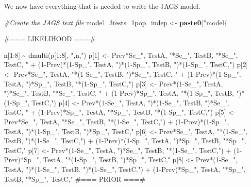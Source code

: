 \documentclass[
]{book}
\newenvironment{Shaded}{\begin{snugshade}}{\end{snugshade}}
\newcommand{\CommentTok}[1]{\textcolor[rgb]{0.56,0.35,0.01}{\textit{#1}}}
\newcommand{\FunctionTok}[1]{\textcolor[rgb]{0.13,0.29,0.53}{\textbf{#1}}}
\newcommand{\NormalTok}[1]{#1}
\newcommand{\OtherTok}[1]{\textcolor[rgb]{0.56,0.35,0.01}{#1}}
\newcommand{\StringTok}[1]{\textcolor[rgb]{0.31,0.60,0.02}{#1}}
\begin{document}
We now have everything that is needed to write the JAGS model.

\begin{Shaded}
\begin{Highlighting}[]
\CommentTok{\#Create the JAGS text file}
\NormalTok{model\_3tests\_1pop\_indep }\OtherTok{\textless{}{-}} \FunctionTok{paste0}\NormalTok{(}\StringTok{"model\{}

\StringTok{\#=== LIKELIHOOD ===\#}

\StringTok{  n[1:8] \textasciitilde{} dmulti(p[1:8], "}\NormalTok{,n,}\StringTok{")}
\StringTok{  p[1] \textless{}{-} Prev*Se\_"}\NormalTok{, TestA, }\StringTok{"*Se\_"}\NormalTok{, TestB, }\StringTok{"*Se\_"}\NormalTok{, TestC, }\StringTok{" + (1{-}Prev)*(1{-}Sp\_"}\NormalTok{, TestA, }\StringTok{")*(1{-}Sp\_"}\NormalTok{, TestB, }\StringTok{")*(1{-}Sp\_"}\NormalTok{, TestC,}\StringTok{")}
\StringTok{  p[2] \textless{}{-} Prev*Se\_"}\NormalTok{, TestA, }\StringTok{"*(1{-}Se\_"}\NormalTok{, TestB, }\StringTok{")*Se\_"}\NormalTok{, TestC, }\StringTok{" + (1{-}Prev)*(1{-}Sp\_"}\NormalTok{, TestA, }\StringTok{")*Sp\_"}\NormalTok{, TestB, }\StringTok{"*(1{-}Sp\_"}\NormalTok{, TestC,}\StringTok{")}
\StringTok{  p[3] \textless{}{-} Prev*(1{-}Se\_"}\NormalTok{, TestA, }\StringTok{")*Se\_"}\NormalTok{, TestB, }\StringTok{"*Se\_"}\NormalTok{, TestC, }\StringTok{" + (1{-}Prev)*Sp\_"}\NormalTok{, TestA, }\StringTok{"*(1{-}Sp\_"}\NormalTok{, TestB, }\StringTok{")*(1{-}Sp\_"}\NormalTok{, TestC,}\StringTok{")}
\StringTok{  p[4] \textless{}{-} Prev*(1{-}Se\_"}\NormalTok{, TestA, }\StringTok{")*(1{-}Se\_"}\NormalTok{, TestB, }\StringTok{")*Se\_"}\NormalTok{, TestC, }\StringTok{" + (1{-}Prev)*Sp\_"}\NormalTok{, TestA, }\StringTok{"*Sp\_"}\NormalTok{, TestB, }\StringTok{"*(1{-}Sp\_"}\NormalTok{, TestC,}\StringTok{")}
\StringTok{  }
\StringTok{  p[5] \textless{}{-} Prev*Se\_"}\NormalTok{, TestA, }\StringTok{"*Se\_"}\NormalTok{, TestB, }\StringTok{"*(1{-}Se\_"}\NormalTok{, TestC,}\StringTok{") + (1{-}Prev)*(1{-}Sp\_"}\NormalTok{, TestA, }\StringTok{")*(1{-}Sp\_"}\NormalTok{, TestB, }\StringTok{")*Sp\_"}\NormalTok{, TestC,}\StringTok{"}
\StringTok{  p[6] \textless{}{-} Prev*Se\_"}\NormalTok{, TestA, }\StringTok{"*(1{-}Se\_"}\NormalTok{, TestB, }\StringTok{")*(1{-}Se\_"}\NormalTok{, TestC,}\StringTok{") + (1{-}Prev)*(1{-}Sp\_"}\NormalTok{, TestA, }\StringTok{")*Sp\_"}\NormalTok{, TestB, }\StringTok{"*Sp\_"}\NormalTok{, TestC,}\StringTok{"}
\StringTok{  p[7] \textless{}{-} Prev*(1{-}Se\_"}\NormalTok{, TestA, }\StringTok{")*Se\_"}\NormalTok{, TestB, }\StringTok{"*(1{-}Se\_"}\NormalTok{, TestC,}\StringTok{") + (1{-}Prev)*Sp\_"}\NormalTok{, TestA, }\StringTok{"*(1{-}Sp\_"}\NormalTok{, TestB, }\StringTok{")*Sp\_"}\NormalTok{, TestC,}\StringTok{"}
\StringTok{  p[8] \textless{}{-} Prev*(1{-}Se\_"}\NormalTok{, TestA, }\StringTok{")*(1{-}Se\_"}\NormalTok{, TestB, }\StringTok{")*(1{-}Se\_"}\NormalTok{, TestC,}\StringTok{") + (1{-}Prev)*Sp\_"}\NormalTok{, TestA, }\StringTok{"*Sp\_"}\NormalTok{, TestB, }\StringTok{"*Sp\_"}\NormalTok{, TestC,}\StringTok{"}
\StringTok{  }
\StringTok{  }
\StringTok{\#=== PRIOR  ===\#}


\end{Highlighting}
\end{Shaded}
\end{document}
